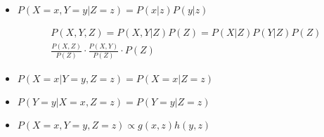 \item





\begin{itemize}
  \item $P(X = x, Y = y|Z = z) = P(x|z)P(y|z)$

  \[\begin{array}{l}
  P(X,Y,Z) = P(X,Y | Z)P(Z)=P(X|Z)P(Y|Z)P(Z) \\
  \frac{P(X,Z)}{P(Z)} \cdot \frac{P(X,Y)}{P(Z)} \cdot P(Z)
  \end{array}\]

  \item $P(X = x|Y = y,Z = z) = P(X = x|Z = z)$


  \item $P(Y = y|X = x,Z = z) = P(Y = y|Z = z)$

  \item $P(X = x,Y = y,Z = z) \propto g(x,z)h(y,z)$

\end{itemize}
